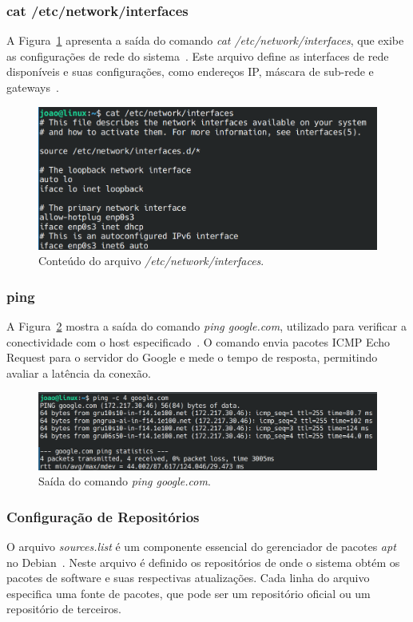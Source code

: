 \documentclass[
	12pt,				%
	oneside,   	        %
	a4paper,			%
	english,			%
	french,				%
	spanish,			%
	brazil,				%
	]{pacotes/abntex2}
\begin{document}
\subsubsection{cat /etc/network/interfaces}
A Figura~\ref{fig:interfaces} apresenta a saída do comando \textit{cat /etc/network/interfaces}, que exibe as configurações de rede do sistema~\cite{manCat}. Este arquivo define as interfaces de rede disponíveis e suas configurações, como endereços IP, máscara de sub-rede e gateways~\cite{manResolvConf}.

\begin{figure}[H]
  \centering
  \includegraphics[scale=0.37]{figuras/interfaces.png}
  \caption{Conteúdo do arquivo \textit{/etc/network/interfaces}.}
  \label{fig:interfaces}
\end{figure}

\subsubsection{ping}
A Figura~\ref{fig:ping} mostra a saída do comando \textit{ping google.com}, utilizado para verificar a conectividade com o host especificado~\cite{manPing}. O comando envia pacotes ICMP Echo Request para o servidor do Google e mede o tempo de resposta, permitindo avaliar a latência da conexão.

\begin{figure}[H]
  \centering
  \includegraphics[scale=0.37]{figuras/ping.png}
  \caption{Saída do comando \textit{ping google.com}.}
  \label{fig:ping}
\end{figure}

\subsubsection{Configuração de Repositórios}
O arquivo \textit{sources.list} é um componente essencial do gerenciador de pacotes \textit{apt} no Debian~\cite{ubuntuApt}. Neste arquivo é definido os repositórios de onde o sistema obtém os pacotes de software e suas respectivas atualizações. Cada linha do arquivo especifica uma fonte de pacotes, que pode ser um repositório oficial ou um repositório de terceiros.
\end{document}
